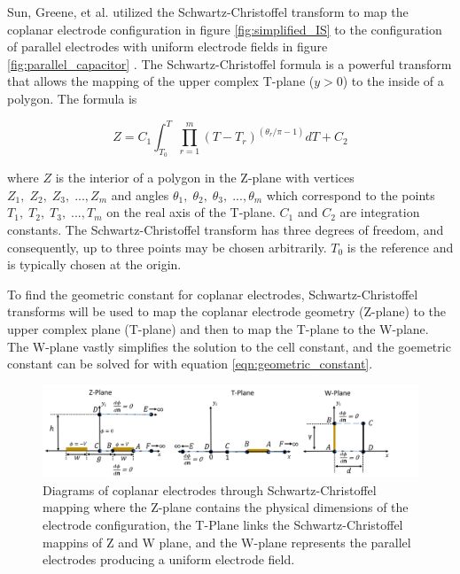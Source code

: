  
    \par Sun, Greene, et al. utilized the Schwartz-Christoffel transform to map the coplanar electrode configuration in figure \ref{fig:simplified_IS} to the configuration of parallel electrodes with uniform electrode fields in figure \ref{fig:parallel_capacitor} \cite{sun_analytical_2007}. The Schwartz-Christoffel formula is a powerful transform that allows the mapping of the upper complex T-plane ($y>0$) to the inside of a polygon. The formula is
    
    \begin{equation}
        Z = C_1 \int_{T_0}^T \prod^m_{r=1} (T - T_r)^{(\theta_r/\pi - 1)} dT + C_2
    \end{equation}
    
    \noindent where $Z$ is the interior of a polygon in the Z-plane with vertices $Z_1,\;Z_2,\;Z_3,\; ...,Z_m$ and angles $\theta_1,\;\theta_2,\;\theta_3,\; ...,\theta_m$ which correspond to the points $T_1,\;T_2,\;T_3,\; ...,T_m$ on the real axis of the T-plane. $C_1$ and $C_2$ are integration constants. The Schwartz-Christoffel transform has three degrees of freedom, and consequently, up to three points may be chosen arbitrarily. $T_0$ is the reference and is typically chosen at the origin.
    
    \par To find the geometric constant for coplanar electrodes, Schwartz-Christoffel transforms will be used to map the coplanar electrode geometry (Z-plane) to the upper complex plane (T-plane) and then to map the T-plane to the W-plane. The W-plane vastly simplifies the solution to the cell constant, and the goemetric constant can be solved for with equation \ref{eqn:geometric_constant}. 
    
    \begin{figure}[h]
        \centering
        \includegraphics[width=\textwidth]{images/scmPlanes.png}
        \caption[Diagrams of coplanar electrodes through Schwartz-Christoffel mapping]{Diagrams of coplanar electrodes through Schwartz-Christoffel mapping where the Z-plane contains the physical dimensions of the electrode configuration, the T-Plane links the Schwartz-Christoffel mappins of Z and W plane, and the W-plane represents the parallel electrodes producing a uniform electrode field.}
        \label{fig:scm_planes}
    \end{figure}
    
